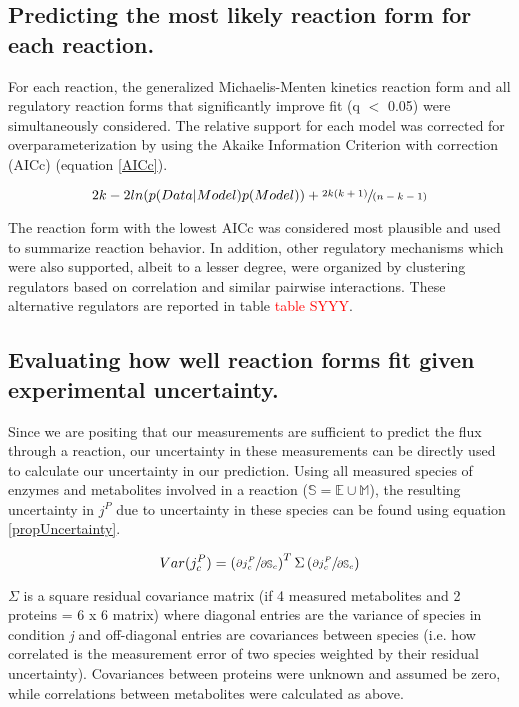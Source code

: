 \subsection{Predicting the most likely reaction form for each reaction.}

For each reaction, the generalized Michaelis-Menten kinetics reaction form and all regulatory reaction forms that significantly improve fit (q $<$ 0.05) were simultaneously considered.  The relative support for each model was corrected for overparameterization by using the Akaike Information Criterion with correction (AICc) (equation \ref{AICc}).

\begin{equation}
2k - 2ln(p(Data|Model)p(Model)) + \sfrac{2k(k+1)}{(n-k-1)}\label{AICc}
\end{equation}

The reaction form with the lowest AICc was considered most plausible and used to summarize reaction behavior.  In addition, other regulatory mechanisms which were also supported, albeit to a lesser degree, were organized by clustering regulators based on correlation and similar pairwise interactions.  These alternative regulators are reported in table \textcolor{red}{table SYYY}.

\subsection{Evaluating how well reaction forms fit given experimental uncertainty.}

Since we are positing that our measurements are sufficient to predict the flux through a reaction, our uncertainty in these measurements can be directly used to calculate our uncertainty in our prediction.  Using all measured species of enzymes and metabolites involved in a reaction ($\mathbb{S} = \mathbb{E} \cup \mathbb{M}$), the resulting uncertainty in $j^{P}$ due to uncertainty in these species can be found using equation \ref{propUncertainty}.

\begin{equation}
Var(j^{P}_{c}) = \left(\sfrac{\partial j^{P}_{c}}{\partial\mathbb{S}_{c}}\right)^{T}\Sigma\left(\sfrac{\partial j^{P}_{c}}{\partial\mathbb{S}_{c}}\right)\label{propUncertainty}
\end{equation}

$\Sigma$ is a square residual covariance matrix (if 4 measured metabolites and 2 proteins = 6 x 6 matrix) where diagonal entries are the variance of species in condition \textit{j} and off-diagonal entries are covariances between species (i.e. how correlated is the measurement error of two species weighted by their residual uncertainty).  Covariances between proteins were unknown and assumed be zero, while correlations between metabolites were calculated as above.

